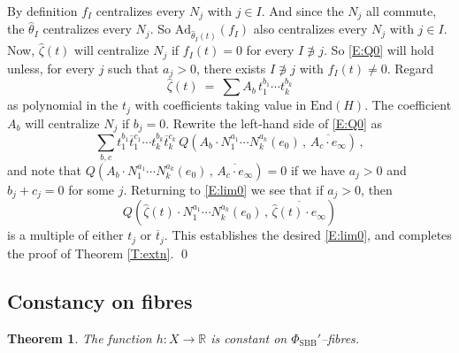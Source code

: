 \documentclass[12pt]{amsart}
\numberwithin{equation}{section}
\numberwithin{table}{section}
\def\z{\zeta}
\def\tAd{\mathrm{Ad}}
\def\tEnd{\mathrm{End}}
\def\bR{\mathbb{R}}
\newtheorem{theorem}[equation]{Theorem}
\theoremstyle{definition}
\theoremstyle{definition}
\theoremstyle{remark}
\def\hPhiS{\Phi_\mathrm{SBB}'}
\begin{document}
By definition $f_I$ centralizes every $N_j$ with $j \in I$.  And since the $N_j$ all commute, the $\hat\theta_I$ centralizes every $N_j$.  So $\tAd_{\hat\theta_I(t)}(f_I)$ also centralizes every $N_j$ with $j \in I$.  Now, $\hat\z(t)$ will centralize $N_j$ if $f_I(t)=0$ for every $I \not\ni j$.  So \eqref{E:Q0} will hold unless, for every $j$ such that $a_j > 0$, there exists $I \not\ni j$ with $f_I(t)\not=0$.  Regard 
\[
  \hat\z(t) \ = \ \sum A_b\,t_1^{b_1} \cdots t_k^{b_k}
\]
as polynomial in the $t_j$ with coefficients taking value in $\tEnd(H)$.  The coefficient $A_b$ will centralize $N_j$ if $b_j=0$.  Rewrite the left-hand side of \eqref{E:Q0} as 
\[
  \sum_{b,c}
  t_1^{b_1} \overline{t}{}^{c_1}_1
  \cdots t_k^{b_k} \overline{t}{}^{c_k}_k \,
  Q \left( A_b \cdot
  N_1^{a_1}\cdots N_k^{a_k}(e_0) \,,\,
  \overline{A_c \cdot e_\infty}
  \right) \,,
\]
and note that 
$Q \left( A_b \cdot N_1^{a_1}\cdots N_k^{a_k}(e_0) \,,\,
  \overline{A_c \cdot e_\infty} \right) = 0$
if we have $a_j>0$ and $b_j+c_j=0$ for some $j$.  Returning to \eqref{E:lim0} we see that if $a_j>0$, then 
\[
  Q \left( \hat\z(t) \cdot N_1^{a_1}\cdots N_k^{a_k}(e_0) \,,\,
  \overline{\hat\z(t) \cdot e_\infty} \right)
\]
is a multiple of either $t_j$ or $\overline{t}{}_j$.  This establishes the desired \eqref{E:lim0}, and completes the proof of Theorem \ref{T:extn}.  \hfill \qed

\subsection{Constancy on fibres} \label{S:cnst}

\begin{theorem} \label{T:cnst}
The function $h : X \to \bR$ is constant on $\hPhiS$--fibres.
\end{theorem}
\end{document}
